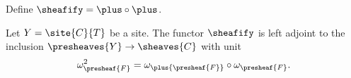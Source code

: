 \begin{definition}
Define $\sheafify = \plus \circ \plus$.
\end{definition}

\begin{lemma}
Let $Y=\site{C}{T}$ be a site.
The functor $\sheafify$ is left adjoint to the inclusion $\presheaves{Y} \rightarrow \sheaves{C}$
with unit 
\[\omega^2_{\presheaf{F}} = \omega_{\plus{\presheaf{F}}} \circ \omega_{\presheaf{F}}.\]
\end{lemma}